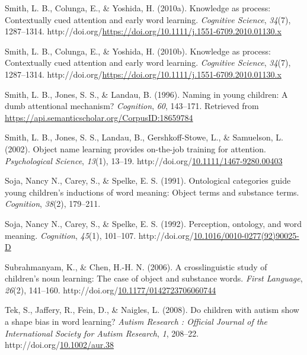 \documentclass[10pt, letterpaper]{article}
\newenvironment{CSLReferences}%
  {}%
  {\par}
\begin{document}
\begin{CSLReferences}{1}{0}
\leavevmode{}%
Smith, L. B., Colunga, E., \& Yoshida, H. (2010a). Knowledge as process:
Contextually cued attention and early word learning. \emph{Cognitive
Science}, \emph{34}(7), 1287--1314.
http://doi.org/\url{https://doi.org/10.1111/j.1551-6709.2010.01130.x}

\leavevmode{}%
Smith, L. B., Colunga, E., \& Yoshida, H. (2010b). Knowledge as process:
Contextually cued attention and early word learning. \emph{Cognitive
Science}, \emph{34}(7), 1287--1314.
http://doi.org/\url{https://doi.org/10.1111/j.1551-6709.2010.01130.x}

\leavevmode{}%
Smith, L. B., Jones, S. S., \& Landau, B. (1996). Naming in young
children: A dumb attentional mechanism? \emph{Cognition}, \emph{60},
143--171. Retrieved from
\url{https://api.semanticscholar.org/CorpusID:18659784}

\leavevmode{}%
Smith, L. B., Jones, S. S., Landau, B., Gershkoff-Stowe, L., \&
Samuelson, L. (2002). Object name learning provides on-the-job training
for attention. \emph{Psychological Science}, \emph{13}(1), 13--19.
http://doi.org/\href{https://doi.org/10.1111/1467-9280.00403}{10.1111/1467-9280.00403}

\leavevmode{}%
Soja, Nancy N., Carey, S., \& Spelke, E. S. (1991). Ontological
categories guide young children's inductions of word meaning: Object
terms and substance terms. \emph{Cognition}, \emph{38}(2), 179--211.

\leavevmode{}%
Soja, Nancy N., Carey, S., \& Spelke, E. S. (1992). Perception,
ontology, and word meaning. \emph{Cognition}, \emph{45}(1), 101--107.
http://doi.org/\href{https://doi.org/10.1016/0010-0277(92)90025-D}{10.1016/0010-0277(92)90025-D}

\leavevmode{}%
Subrahmanyam, K., \& Chen, H.-H. N. (2006). A crosslinguistic study of
children's noun learning: {The} case of object and substance words.
\emph{First Language}, \emph{26}(2), 141--160.
http://doi.org/\href{https://doi.org/10.1177/0142723706060744}{10.1177/0142723706060744}

\leavevmode{}%
Tek, S., Jaffery, R., Fein, D., \& Naigles, L. (2008). Do children with
autism show a shape bias in word learning? \emph{Autism Research :
Official Journal of the International Society for Autism Research},
\emph{1}, 208--22.
http://doi.org/\href{https://doi.org/10.1002/aur.38}{10.1002/aur.38}


\end{CSLReferences}
\end{document}
